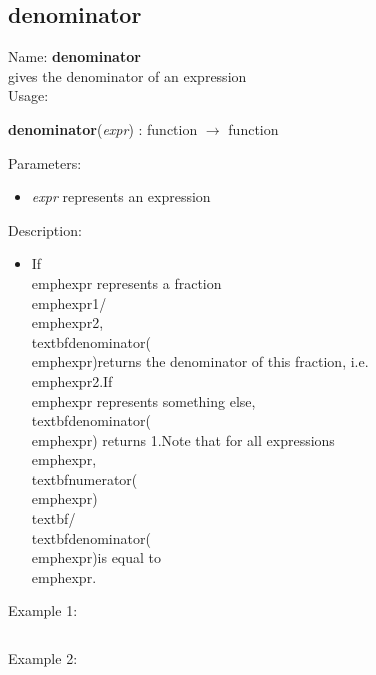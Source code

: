 \subsection{denominator}
\label{labdenominator}
\noindent Name: \textbf{denominator}\\
gives the denominator of an expression\\
\noindent Usage: 
\begin{center}
\textbf{denominator}(\emph{expr}) : \textsf{function} $\rightarrow$ \textsf{function}\\
\end{center}
Parameters: 
\begin{itemize}
\item \emph{expr} represents an expression
\end{itemize}
\noindent Description: \begin{itemize}

\item If \\emph{expr} represents a fraction \\emph{expr1}/\\emph{expr2}, \\textbf{denominator}(\\emph{expr})\n   returns the denominator of this fraction, i.e. \\emph{expr2}.\n    \n   If \\emph{expr} represents something else, \\textbf{denominator}(\\emph{expr}) \n   returns 1.\n    \n   Note that for all expressions \\emph{expr}, \\textbf{numerator}(\\emph{expr}) \\textbf{/} \\textbf{denominator}(\\emph{expr})\n   is equal to \\emph{expr}.\n\end{itemize}
\noindent Example 1: 
\begin{center}\begin{minipage}{15cm}\begin{Verbatim}[frame=single]
\end{Verbatim}
\end{minipage}\end{center}
\noindent Example 2: 
\begin{center}\begin{minipage}{15cm}\begin{Verbatim}[frame=single]
\end{Verbatim}
\end{minipage}\end{center}
